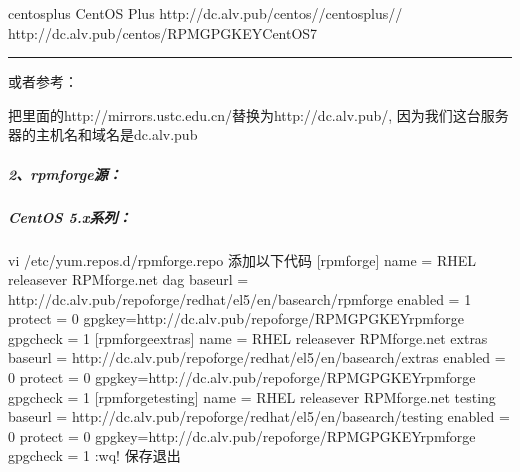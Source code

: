 \documentclass[letterpaper,10pt,english]{sphinxmanual}
\begin{document}
\begin{sphinxVerbatim}[commandchars=\\\{\}]
\PYG{o}{[}centosplus\PYG{o}{]}
CentOS\PYGZhy{} \PYGZhy{} Plus
http://dc.alv.pub/centos//centosplus//
http://dc.alv.pub/centos/RPM\PYGZhy{}GPG\PYGZhy{}KEY\PYGZhy{}CentOS\PYGZhy{}7
\end{sphinxVerbatim}


\bigskip\hrule\bigskip


或者参考：

把里面的http://mirrors.ustc.edu.cn/替换为http://dc.alv.pub/, 因为我们这台服务器的主机名和域名是dc.alv.pub


\subparagraph{2、rpmforge源：}
\label{\detokenize{software_manage/yum/yum_official_sync:rpmforge}}

\subparagraph{CentOS 5.x系列：}
\label{\detokenize{software_manage/yum/yum_official_sync:id11}}
%
\begin{sphinxVerbatim}[commandchars=\\\{\}]
vi /etc/yum.repos.d/rpmforge.repo \PYGZsh{}添加以下代码
[rpmforge]
name = RHEL \PYGZdl{}releasever \PYGZhy{} RPMforge.net \PYGZhy{} dag
baseurl = http://dc.alv.pub/repoforge/redhat/el5/en/\PYGZdl{}basearch/rpmforge
enabled = 1
protect = 0
gpgkey=http://dc.alv.pub/repoforge/RPM\PYGZhy{}GPG\PYGZhy{}KEY\PYGZhy{}rpmforge
gpgcheck = 1
[rpmforge\PYGZhy{}extras]
name = RHEL \PYGZdl{}releasever \PYGZhy{} RPMforge.net \PYGZhy{} extras
baseurl = http://dc.alv.pub/repoforge/redhat/el5/en/\PYGZdl{}basearch/extras
enabled = 0
protect = 0
gpgkey=http://dc.alv.pub/repoforge/RPM\PYGZhy{}GPG\PYGZhy{}KEY\PYGZhy{}rpmforge
gpgcheck = 1
[rpmforge\PYGZhy{}testing]
name = RHEL \PYGZdl{}releasever \PYGZhy{} RPMforge.net \PYGZhy{} testing
baseurl = http://dc.alv.pub/repoforge/redhat/el5/en/\PYGZdl{}basearch/testing
enabled = 0
protect = 0
gpgkey=http://dc.alv.pub/repoforge/RPM\PYGZhy{}GPG\PYGZhy{}KEY\PYGZhy{}rpmforge
gpgcheck = 1
:wq! \PYGZsh{}保存退出
\end{sphinxVerbatim}
\end{document}
